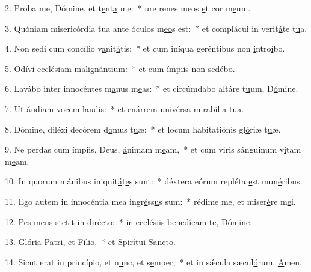2. Proba me, Dómine, et t\uline{e}nt\uline{a} me:~* ure renes meos \uline{e}t cor m\uline{e}um.\par 
3. Quóniam misericórdia tua ante óculos m\uline{e}\uline{o}s est:~* et complácui in verit\uline{á}te t\uline{u}a.\par 
4. Non sedi cum concílio v\uline{a}nit\uline{á}tis:~* et cum iníqua geréntibus non \uline{i}ntro\uline{í}bo.\par 
5. Odívi ecclésiam malign\uline{á}nt\uline{i}um:~* et cum ímpiis n\uline{o}n sed\uline{é}bo.\par 
6. Lavábo inter innocéntes m\uline{a}nus m\uline{e}as:~* et circúmdabo altáre t\uline{u}um, D\uline{ó}mine.\par 
7. Ut áudiam v\uline{o}cem l\uline{au}dis:~* et enárrem univérsa mirab\uline{í}lia t\uline{u}a.\par 
8. Dómine, diléxi decórem d\uline{o}mus t\uline{u}æ:~* et locum habitatiónis gl\uline{ó}riæ t\uline{u}æ.\par 
9. Ne perdas cum ímpiis, Deus, \uline{á}nimam m\uline{e}am,~* et cum viris sánguinum v\uline{i}tam m\uline{e}am.\par 
10. In quorum mánibus iniquit\uline{á}t\uline{e}s sunt:~* déxtera eórum repléta \uline{e}st mun\uline{é}ribus.\par 
11. Ego autem in innocéntia mea ingr\uline{é}ss\uline{u}s sum:~* rédime me, et miser\uline{é}re m\uline{e}i.\par 
12. Pes meus stetit \uline{i}n dir\uline{é}cto:~* in ecclésiis bened\uline{í}cam te, D\uline{ó}mine.\par 
13. Glória Patri, et F\uline{í}l\uline{i}o,~* et Spir\uline{í}tui S\uline{a}ncto.\par 
14. Sicut erat in princípio, et n\uline{u}nc, et s\uline{e}mper,~* et in sǽcula sæcul\uline{ó}rum. \uline{A}men.\par 
